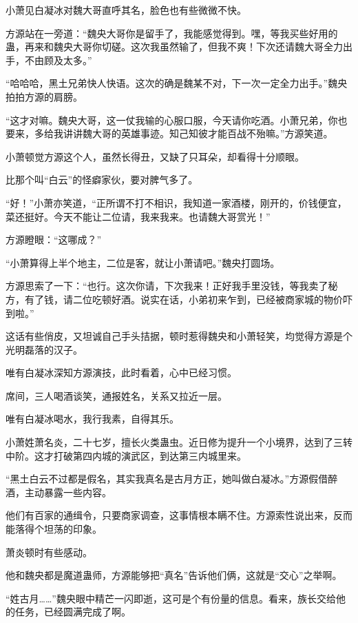 \begin{this_body}
小萧见白凝冰对魏大哥直呼其名，脸色也有些微微不快。

方源站在一旁道：“魏央大哥你是留手了，我能感觉得到。嘿，等我买些好用的蛊，再来和魏央大哥你切磋。这次我虽然输了，但我不爽！下次还请魏大哥全力出手，不由顾及太多。”

“哈哈哈，黑土兄弟快人快语。这次的确是魏某不对，下一次一定全力出手。”魏央拍拍方源的肩膀。

“这才对嘛。魏央大哥，这一仗我输的心服口服，今天请你吃酒。小萧兄弟，你也要来，多给我讲讲魏大哥的英雄事迹。知己知彼才能百战不殆嘛。”方源笑道。

小萧顿觉方源这个人，虽然长得丑，又缺了只耳朵，却看得十分顺眼。

比那个叫“白云”的怪癖家伙，要对脾气多了。

“好！”小萧亦笑道，“正所谓不打不相识，我知道一家酒楼，刚开的，价钱便宜，菜还挺好。今天不能让二位请，我来我来。也请魏大哥赏光！”

方源瞪眼：“这哪成？”

“小萧算得上半个地主，二位是客，就让小萧请吧。”魏央打圆场。

方源思索了一下：“也行。这次你请，下次我来！正好我手里没钱，等我卖了秘方，有了钱，请二位吃顿好酒。说实在话，小弟初来乍到，已经被商家城的物价吓到啦。”

这话有些俏皮，又坦诚自己手头拮据，顿时惹得魏央和小萧轻笑，均觉得方源是个光明磊落的汉子。

唯有白凝冰深知方源演技，此时看着，心中已经习惯。

席间，三人喝酒谈笑，通报姓名，关系又拉近一层。

唯有白凝冰喝水，我行我素，自得其乐。

小萧姓萧名炎，二十七岁，擅长火类蛊虫。近日修为提升一个小境界，达到了三转中阶。这才打破第四内城的演武区，到达第三内城里来。

“黑土白云不过都是假名，其实我真名是古月方正，她叫做白凝冰。”方源假借醉酒，主动暴露一些内容。

他们有百家的通缉令，只要商家调查，这事情根本瞒不住。方源索性说出来，反而能落得个坦荡的印象。

萧炎顿时有些感动。

他和魏央都是魔道蛊师，方源能够把“真名”告诉他们俩，这就是“交心”之举啊。

“姓古月……”魏央眼中精芒一闪即逝，这可是个有份量的信息。看来，族长交给他的任务，已经圆满完成了啊。

\end{this_body}

